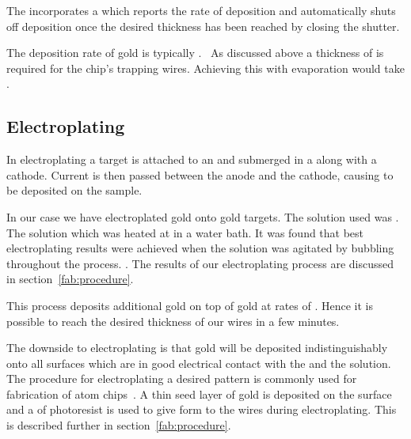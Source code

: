 The  incorporates a  which reports the rate of
deposition and automatically shuts off deposition once the desired thickness
has been reached by closing the shutter. 

The deposition rate of gold is typically .~\cite{} As discussed above 
a thickness of  is required for the chip's trapping wires. Achieving
this with evaporation would take . 

\subsection{Electroplating}

In electroplating a target is attached to an  and submerged in a
 along with a cathode. Current is then passed between
the anode and the cathode, causing  to be deposited on
the sample. 


In our case we have electroplated gold onto gold targets. The solution used was
. The solution which was heated at
 in a water bath. It was found that best electroplating results were
achieved when the solution was agitated by bubbling throughout the process.
.  The results of our electroplating
process are discussed in section~\ref{fab:procedure}.

This process deposits additional gold on top of gold at rates of . Hence it is possible to reach the desired thickness
of our wires in a few minutes.

The downside to electroplating is that gold will be deposited indistinguishably
onto all surfaces which are in good electrical contact with the  and
the solution. The procedure for electroplating a desired pattern is commonly
used for fabrication of atom chips~\cite{}. A thin seed layer of gold is
deposited on the surface and a  of photoresist is used to give form
to the wires during electroplating. This is described further in
section~\ref{fab:procedure}. 

